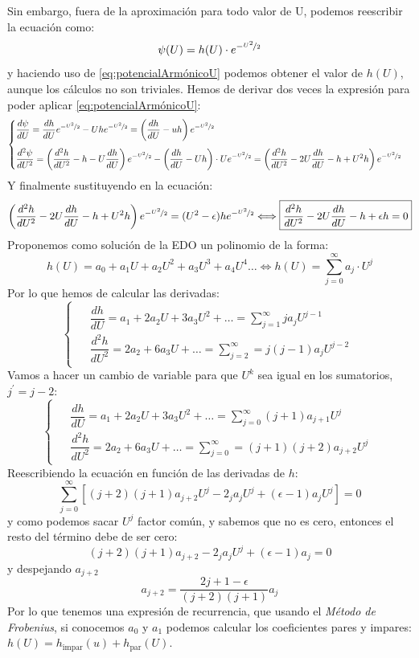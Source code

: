 \documentclass{report}
\begin{document}
    \noindent Sin embargo, fuera de la aproximación para todo valor de U, podemos
    reescribir la ecuación como:
    \[\psi(U)=h(U)\cdot e^{-\nicefrac{U^2}{2}}\]
    y haciendo uso de \ref{eq:potencialArmónicoU} podemos obtener el valor
    de $h(U)$, aunque los cálculos no son triviales. Hemos de derivar dos veces
    la expresión para poder aplicar \ref{eq:potencialArmónicoU}:
    \[
      \begin{cases}
        \begin{aligned}
          &\dfrac{d\psi}{dU}=\dfrac{dh}{dU}e^{-\nicefrac{U^2}{2}}-Uhe^{-\nicefrac{U^2}{2}}=
          \left(\dfrac{dh}{dU}-uh\right)e^{-\nicefrac{U^2}{2}}\\[5pt]
          &\dfrac{d^2\psi}{dU^2}=\left(\dfrac{d^2h}{dU^2}-h-U\dfrac{dh}{dU}\right)e^{-\nicefrac{U^2}{2}}
          -\left(\dfrac{dh}{dU}-Uh\right)\cdot Ue^{-\nicefrac{U^2}{2}}=
          \left(\dfrac{d^2h}{dU^2}-2U\dfrac{dh}{dU}-h+U^2h\right)e^{-\nicefrac{U^2}{2}}
        \end{aligned}  
      \end{cases}
    \]
    Y finalmente sustituyendo en la ecuación:
    \[\left(\dfrac{d^2h}{dU^2}-2U\dfrac{dh}{dU}-h+U^2h\right)e^{-\nicefrac{U^2}{2}}
    =(U^2-\epsilon)he^{-\nicefrac{U^2}{2}}\Longleftrightarrow\boxed{\dfrac{d^2h}{dU^2}
    -2U\dfrac{dh}{dU}-h+\epsilon h=0}\]
    Proponemos como solución de la EDO un polinomio de la forma:
    \[h(U)=a_0+a_1U+a_2U^2+a_3U^3+a_4U^4\dots\Longleftrightarrow
    h(U)=\sum_{j=0}^{\infty}a_j\cdot U^j\]
    Por lo que hemos de calcular las derivadas:
    \[
      \begin{cases}
        \begin{aligned}
          &\dfrac{dh}{dU}    =a_1+2a_2U+3a_3U^2+\dots=\sum_{j=1}^\infty ja_jU^{j-1}\\[3pt]
          &\dfrac{d^2h}{dU^2}=2a_2+6a_3U+\dots=\sum_{j=2}^\infty= j(j-1)a_jU^{j-2}
        \end{aligned}
      \end{cases}
    \]
    Vamos a hacer un cambio de variable para que $U^k$ sea igual en los sumatorios,
    $j^\prime=j-2$:
    \[
      \begin{cases}
        \begin{aligned}
          &\dfrac{dh}{dU}    =a_1+2a_2U+3a_3U^2+\dots=\sum_{j=0}^\infty (j+1)a_{j+1}U^j\\[3pt]
          &\dfrac{d^2h}{dU^2}=2a_2+6a_3U+\dots=\sum_{j=0}^\infty= (j+1)(j+2)a_{j+2}U^j
        \end{aligned}
      \end{cases}
    \]
    Reescribiendo la ecuación en función de las derivadas de $h$:
    \[\sum_{j=0}^{\infty}\left[(j+2)(j+1)a_{j+2}U^j-2_ja_jU^j+(\epsilon-1)a_jU^j\right]=0\]
    y como podemos sacar $U^j$ factor común, y sabemos que no es cero, entonces
    el resto del término debe de ser cero:
    \[(j+2)(j+1)a_{j+2}-2_ja_jU^j+(\epsilon-1)a_j=0\]
    y despejando $a_{j+2}$
    \[\boxed{a_{j+2}=\dfrac{2j+1-\epsilon}{(j+2)(j+1)}a_j}\]
    Por lo que tenemos una expresión de recurrencia, que usando el \textit{Método de Frobenius},
    si conocemos $a_0$ y $a_1$ podemos calcular los coeficientes pares y impares:
    $h(U)=h_{\text{impar}}(u)+h_{\text{par}}(U)$.\\
\end{document}
